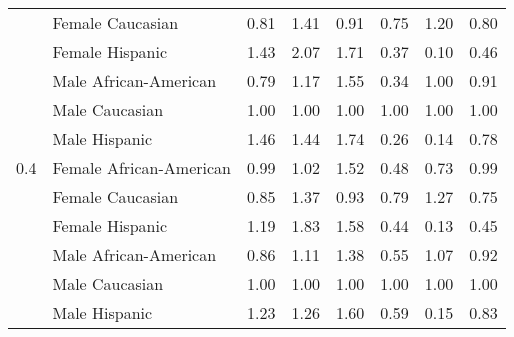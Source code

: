 \begin{tabular}{llrrrrrr}
    & Female Caucasian &             0.81 &           1.41 &                 0.91 &           0.75 &           1.20 &           0.80 \\
    & Female Hispanic &             1.43 &           2.07 &                 1.71 &           0.37 &           0.10 &           0.46 \\
    & Male African-American &             0.79 &           1.17 &                 1.55 &           0.34 &           1.00 &           0.91 \\
    & Male Caucasian &             1.00 &           1.00 &                 1.00 &           1.00 &           1.00 &           1.00 \\
    & Male Hispanic &             1.46 &           1.44 &                 1.74 &           0.26 &           0.14 &           0.78 \\
0.4 & Female African-American &             0.99 &           1.02 &                 1.52 &           0.48 &           0.73 &           0.99 \\
    & Female Caucasian &             0.85 &           1.37 &                 0.93 &           0.79 &           1.27 &           0.75 \\
    & Female Hispanic &             1.19 &           1.83 &                 1.58 &           0.44 &           0.13 &           0.45 \\
    & Male African-American &             0.86 &           1.11 &                 1.38 &           0.55 &           1.07 &           0.92 \\
    & Male Caucasian &             1.00 &           1.00 &                 1.00 &           1.00 &           1.00 &           1.00 \\
    & Male Hispanic &             1.23 &           1.26 &                 1.60 &           0.59 &           0.15 &           0.83 \\
\bottomrule
\end{tabular}
